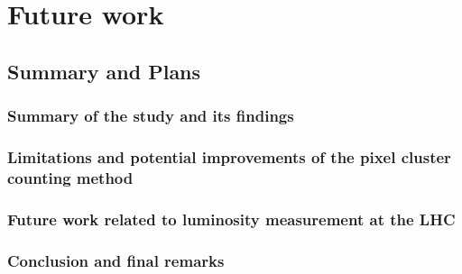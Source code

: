 \chapter{Future work}  %

\ifpdf
    \graphicspath{{Chapter8/Figs/Raster/}{Chapter8/Figs/PDF/}{Chapter8/Figs/}}
\else
    \graphicspath{{Chapter8/Figs/Vector/}{Chapter8/Figs/}}
\fi


\section{Summary and Plans} 
\label{sec:con}

\subsection{Summary of the study and its findings}
\subsection{Limitations and potential improvements of the pixel cluster counting method}
\subsection{Future work related to luminosity measurement at the LHC}
\subsection{Conclusion and final remarks}
